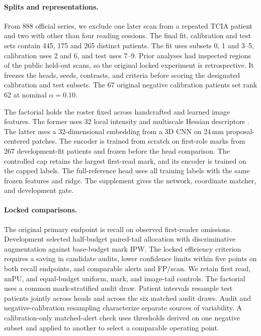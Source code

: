 \paragraph{Splits and representations.}
From 888 official series, we exclude one later scan from a repeated TCIA patient and two with other than four reading sessions. The final fit, calibration and test sets contain 445, 175 and 265 distinct patients. The fit uses subsets 0, 1 and 3--5, calibration uses 2 and 6, and test uses 7--9. Prior analyses had inspected regions of the public held-out scans, so the original locked experiment is retrospective. It freezes the heads, seeds, contrasts, and criteria before scoring the designated calibration and test subsets. The 67 original negative calibration patients set rank 62 at nominal $\alpha=0.10$.

The factorial holds the roster fixed across handcrafted and learned image features. The former uses 32 local intensity and multiscale Hessian descriptors \cite{li2003}. The latter uses a 32-dimensional embedding from a 3D CNN on 24\,mm proposal-centered patches. The encoder is trained from scratch on first-role marks from 267 development-fit patients and frozen before the head comparison. The controlled cap retains the largest first-read mark, and its encoder is trained on the capped labels. The full-reference head uses all training labels with the same frozen features and ridge. The supplement gives the network, coordinate matcher, and development gate.

\paragraph{Locked comparisons.}
The original primary endpoint is recall on observed first-reader omissions. Development selected half-budget paired-tail allocation with discriminative augmentation against base-budget mark IPW. The locked efficiency criterion requires a saving in candidate audits, lower confidence limits within five points on both recall endpoints, and comparable alerts and FP/scan. We retain first read, nnPU, and equal-budget uniform, mark, and image-tail controls. The factorial uses a common mark-stratified audit draw. Patient intervals resample test patients jointly across heads and across the six matched audit draws. Audit and negative-calibration resampling characterize separate sources of variability. A calibration-only matched-alert check uses thresholds derived on one negative subset and applied to another to select a comparable operating point.

